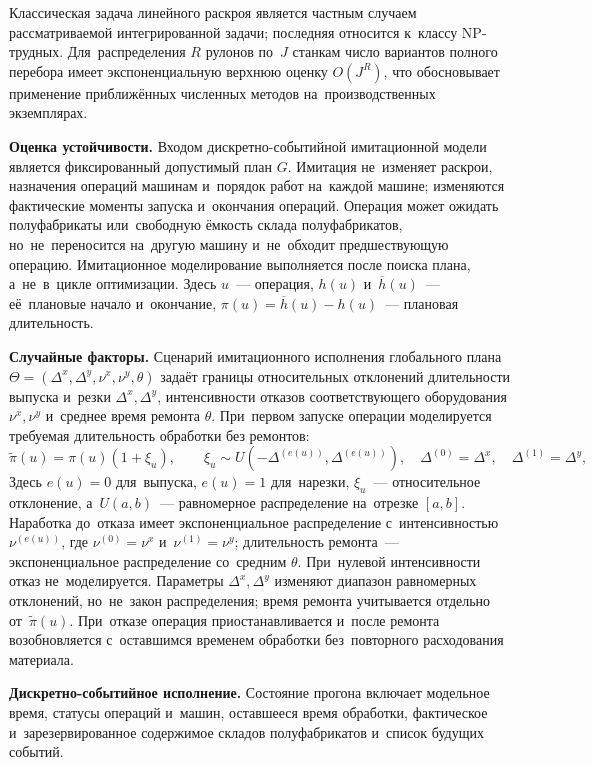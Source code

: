 Классическая задача линейного раскроя является частным случаем рассматриваемой интегрированной задачи; последняя относится к~классу NP-трудных. Для~распределения $R$ рулонов по~$J$ станкам число вариантов полного перебора имеет экспоненциальную верхнюю оценку $O(J^R)$, что обосновывает применение приближённых численных методов на~производственных экземплярах.

\textbf{Оценка устойчивости.} Входом дискретно-событийной имитационной модели является фиксированный допустимый план $G$. Имитация не~изменяет раскрои, назначения операций машинам и~порядок работ на~каждой машине; изменяются фактические моменты запуска и~окончания операций. Операция может ожидать полуфабрикаты или~свободную ёмкость склада полуфабрикатов, но~не~переносится на~другую машину и~не~обходит предшествующую операцию. Имитационное моделирование выполняется после поиска плана, а~не~в~цикле оптимизации. Здесь $u$~--- операция, $h(u)$ и~$\overline h(u)$~--- её~плановые начало и~окончание, $\pi(u)=\overline h(u)-h(u)$~--- плановая длительность.

\textbf{Случайные факторы.} Сценарий имитационного исполнения глобального плана $\Theta=(\Delta^x,\Delta^y,\nu^x,\nu^y,\theta)$ задаёт границы относительных отклонений длительности выпуска и~резки $\Delta^x,\Delta^y$, интенсивности отказов соответствующего оборудования $\nu^x,\nu^y$ и~среднее время ремонта $\theta$. При~первом запуске операции моделируется требуемая длительность обработки без ремонтов:
\[
\widetilde{\pi}(u)=\pi(u)(1+\xi_u),\qquad
\xi_u\sim U(-\Delta^{(e(u))},\Delta^{(e(u))}),
\quad \Delta^{(0)}=\Delta^x,\quad\Delta^{(1)}=\Delta^y,
\]
Здесь $e(u)=0$ для~выпуска, $e(u)=1$ для~нарезки, $\xi_u$~--- относительное отклонение, а~$U(a,b)$~--- равномерное распределение на~отрезке $[a,b]$. Наработка до~отказа имеет экспоненциальное распределение с~интенсивностью $\nu^{(e(u))}$, где $\nu^{(0)}=\nu^x$ и~$\nu^{(1)}=\nu^y$; длительность ремонта~--- экспоненциальное распределение со~средним $\theta$. При~нулевой интенсивности отказ не~моделируется. Параметры $\Delta^x,\Delta^y$ изменяют диапазон равномерных отклонений, но~не~закон распределения; время ремонта учитывается отдельно от~$\widetilde{\pi}(u)$. При~отказе операция приостанавливается и~после ремонта возобновляется с~оставшимся временем обработки без~повторного расходования материала.

\textbf{Дискретно-событийное исполнение.} Состояние прогона включает модельное время, статусы операций и~машин, оставшееся время обработки, фактическое и~зарезервированное содержимое складов полуфабрикатов и~список будущих событий.

